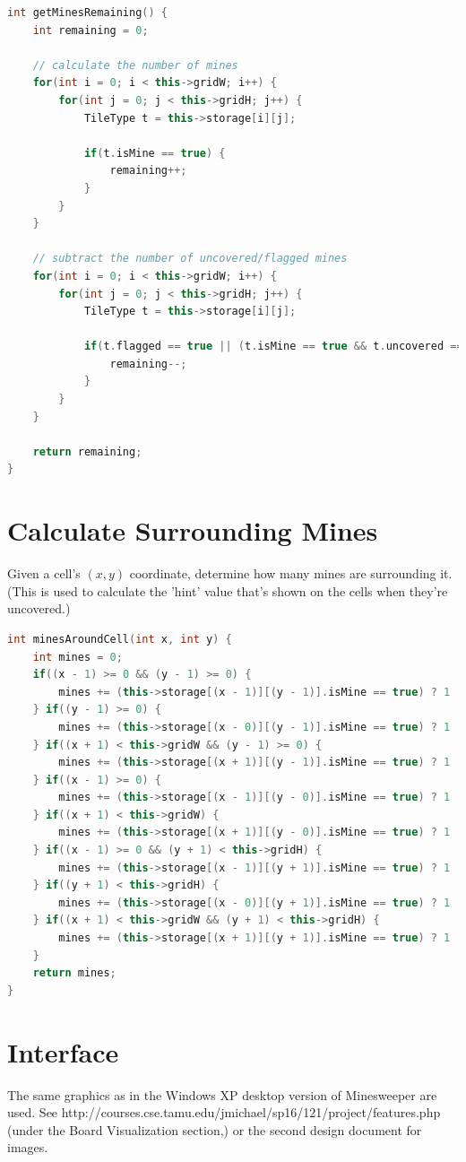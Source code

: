 \documentclass[11pt]{article}
\begin{document}
\begin{lstlisting}[frame=single,language=C++]
int getMinesRemaining() {
	int remaining = 0;

	// calculate the number of mines
	for(int i = 0; i < this->gridW; i++) {
		for(int j = 0; j < this->gridH; j++) {
			TileType t = this->storage[i][j];

			if(t.isMine == true) {
				remaining++;
			}
		}
	}

	// subtract the number of uncovered/flagged mines
	for(int i = 0; i < this->gridW; i++) {
		for(int j = 0; j < this->gridH; j++) {
			TileType t = this->storage[i][j];

			if(t.flagged == true || (t.isMine == true && t.uncovered == true)) {
				remaining--;
			}
		}
	}

	return remaining;
}
\end{lstlisting}

\section{Calculate Surrounding Mines}
Given a cell's $(x, y)$ coordinate, determine how many mines are surrounding it. (This is used to calculate the 'hint' value that's shown on the cells when they're uncovered.)

\begin{lstlisting}[frame=single,language=C++]
int minesAroundCell(int x, int y) {
	int mines = 0;
	if((x - 1) >= 0 && (y - 1) >= 0) {
		mines += (this->storage[(x - 1)][(y - 1)].isMine == true) ? 1 : 0;
	} if((y - 1) >= 0) {
		mines += (this->storage[(x - 0)][(y - 1)].isMine == true) ? 1 : 0;
	} if((x + 1) < this->gridW && (y - 1) >= 0) {
		mines += (this->storage[(x + 1)][(y - 1)].isMine == true) ? 1 : 0;
	} if((x - 1) >= 0) {
		mines += (this->storage[(x - 1)][(y - 0)].isMine == true) ? 1 : 0;
	} if((x + 1) < this->gridW) {
		mines += (this->storage[(x + 1)][(y - 0)].isMine == true) ? 1 : 0;
	} if((x - 1) >= 0 && (y + 1) < this->gridH) {
		mines += (this->storage[(x - 1)][(y + 1)].isMine == true) ? 1 : 0;
	} if((y + 1) < this->gridH) {
		mines += (this->storage[(x - 0)][(y + 1)].isMine == true) ? 1 : 0;
	} if((x + 1) < this->gridW && (y + 1) < this->gridH) {
		mines += (this->storage[(x + 1)][(y + 1)].isMine == true) ? 1 : 0;
	}
	return mines;
}
\end{lstlisting}

\section{Interface}
The same graphics as in the Windows XP desktop version of Minesweeper are used. See http://courses.cse.tamu.edu/jmichael/sp16/121/project/features.php (under the Board Visualization section,) or the second design document for images.
\end{document}
